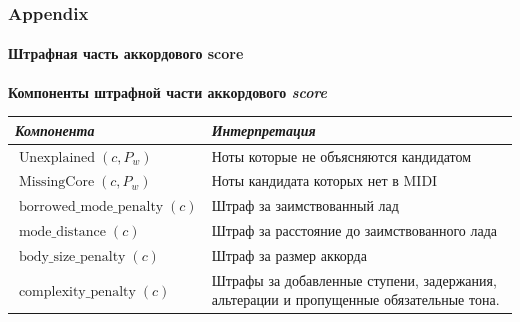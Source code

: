 \documentclass[aspectratio=169]{beamer}
\begin{document}
\begin{frame}
\frametitle{Appendix}
\framesubtitle{Штрафная часть аккордового score}
\hypertarget{negative-score}{}
\vspace{-0.1cm}
{\fontsize{9.5}{11.5}\selectfont
\textbf{Компоненты штрафной части аккордового \textit{score}}\\[0.08cm]
\setlength{\tabcolsep}{4pt}
\renewcommand{\arraystretch}{1.22}
\begin{tabular}{@{}p{}p{}@{}}
\toprule
\textit{Компонента} & \textit{Интерпретация} \\
\midrule
$\operatorname{Unexplained}(c, P_w)$ & Ноты которые не объясняются кандидатом \\
$\operatorname{MissingCore}(c, P_w)$ & Ноты кандидата которых нет в MIDI \\
$\operatorname{borrowed\_mode\_penalty}(c)$ & Штраф за заимствованный лад \\
$\operatorname{mode\_distance}(c)$ & Штраф за расстояние до заимствованного лада \\
$\operatorname{body\_size\_penalty}(c)$ & Штраф за размер аккорда \\
$\operatorname{complexity\_penalty}(c)$ & Штрафы за добавленные ступени, задержания, альтерации и пропущенные обязательные тона. \\
\bottomrule
\end{tabular}
}
\end{frame}
\end{document}
